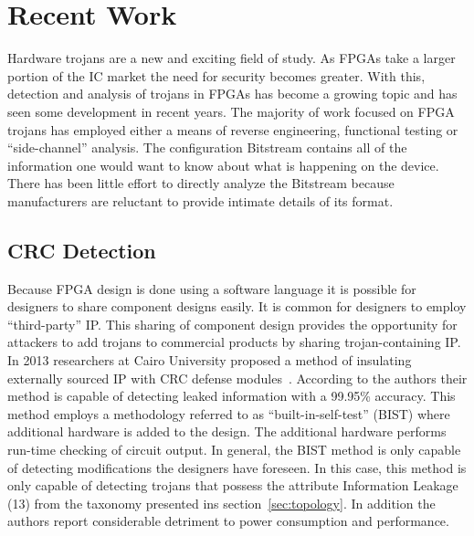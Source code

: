 \section{Recent Work}
Hardware trojans are a new and exciting field of study.
As \acrshort{FPGA}s take a larger portion of the \acrfull{IC} market the need for security becomes greater.
With this, detection and analysis of trojans in \acrshort{FPGA}s has become a growing topic and has seen some development in recent years.
The majority of work focused on \acrshort{FPGA} trojans has employed either a means of reverse engineering, functional testing or ``side-channel'' analysis.
The configuration \gls{Bitstream} contains all of the information one would want to know about what is happening on the device.
There has been little effort to directly analyze the \gls{Bitstream} because manufacturers are reluctant to provide intimate details of its format.
  
\subsection{\acrfull{CRC} Detection} \label{sec:crcDetection}
Because \acrshort{FPGA} design is done using a software language it is possible for designers to share component designs easily.
It is common for designers to employ ``third-party'' \acrfull{IP}. 
This sharing of component design provides the opportunity for attackers to add trojans to commercial products by sharing trojan-containing \acrshort{IP}.
In 2013 researchers at Cairo University proposed a method of insulating externally sourced \acrshort{IP} with \acrfull{CRC} defense modules~\cite{crcDetection}.
According to the authors their method is capable of detecting leaked information with a 99.95\% accuracy.
This method employs a methodology referred to as ``built-in-self-test'' (BIST) where additional hardware is added to the design.
The additional hardware performs run-time checking of circuit output.
In general, the BIST method is only capable of detecting modifications the designers have foreseen.
In this case, this method is only capable of detecting trojans that possess the attribute Information Leakage (13) from the taxonomy presented ins section~\ref{sec:topology}.
In addition the authors report considerable detriment to power consumption and performance.



